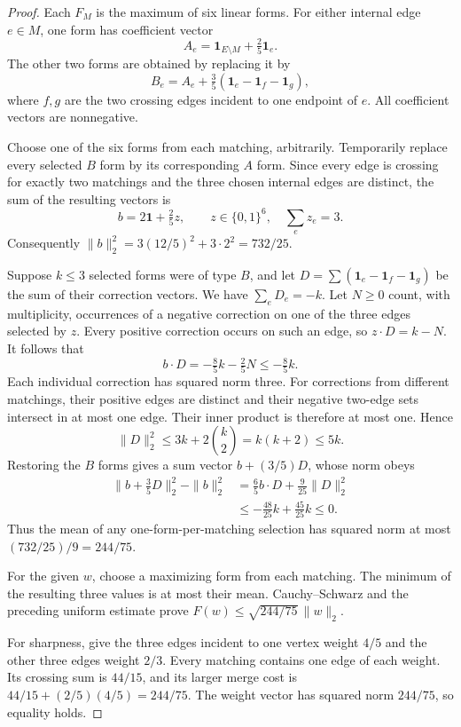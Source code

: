\begin{proof}
Each $F_M$ is the maximum of six linear forms. For either internal edge
$e\in M$, one form has coefficient vector
\[
 A_e=\mathbf 1_{E\setminus M}+\tfrac25\mathbf 1_e.
\]
The other two forms are obtained by replacing it by
\[
 B_e=A_e+\tfrac35(\mathbf 1_e-\mathbf 1_f-\mathbf 1_g),
\]
where $f,g$ are the two crossing edges incident to one endpoint of $e$.
All coefficient vectors are nonnegative.

Choose one of the six forms from each matching, arbitrarily. Temporarily
replace every selected $B$ form by its corresponding $A$ form. Since every
edge is crossing for exactly two matchings and the three chosen internal
edges are distinct, the sum of the resulting vectors is
\[
 b=2\mathbf 1+\tfrac25 z,
 \qquad z\in\{0,1\}^6,\quad\sum_ez_e=3.
\]
Consequently $\|b\|_2^2=3(12/5)^2+3\cdot2^2=732/25$.

Suppose $k\le3$ selected forms were of type $B$, and let
$D=\sum(\mathbf 1_e-\mathbf 1_f-\mathbf 1_g)$ be the sum of their
correction vectors. We have $\sum_eD_e=-k$. Let $N\ge0$ count, with
multiplicity, occurrences of a negative correction on one of the three
edges selected by $z$. Every positive correction occurs on such an edge,
so $z\mathbin\cdot D=k-N$. It follows that
\[
 b\mathbin\cdot D=-\tfrac85k-\tfrac25N\le-\tfrac85k.
\]
Each individual correction has squared norm three. For corrections from
different matchings, their positive edges are distinct and their negative
two-edge sets intersect in at most one edge. Their inner product is
therefore at most one. Hence
\[
 \|D\|_2^2\le3k+2\binom k2=k(k+2)\le5k.
\]
Restoring the $B$ forms gives a sum vector $b+(3/5)D$, whose norm obeys
\begin{align*}
 \|b+\tfrac35D\|_2^2-\|b\|_2^2
 &=\tfrac65 b\mathbin\cdot D+\tfrac9{25}\|D\|_2^2\\
 &\le-\tfrac{48}{25}k+\tfrac{45}{25}k\le0.
\end{align*}
Thus the mean of any one-form-per-matching selection has squared norm at
most $(732/25)/9=244/75$.

For the given $w$, choose a maximizing form from each matching. The minimum
of the resulting three values is at most their mean. Cauchy--Schwarz and
the preceding uniform estimate prove
$F(w)\le\sqrt{244/75}\,\|w\|_2$.

For sharpness, give the three edges incident to one vertex weight $4/5$
and the other three edges weight $2/3$. Every matching contains one edge
of each weight. Its crossing sum is $44/15$, and its larger merge cost is
$44/15+(2/5)(4/5)=244/75$. The weight vector has squared norm $244/75$,
so equality holds.
\end{proof}

